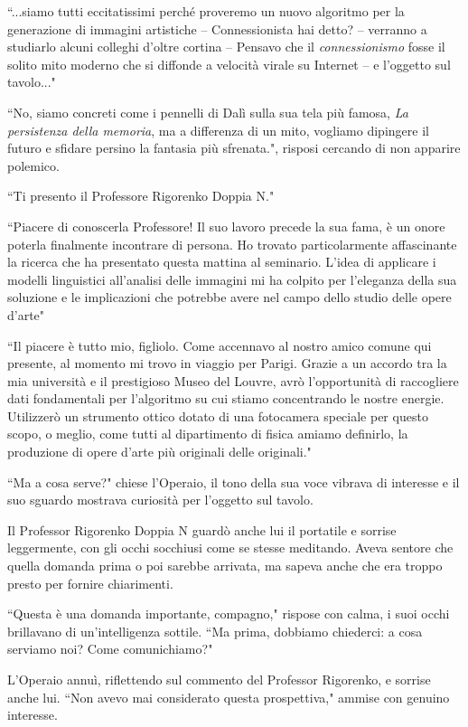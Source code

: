 \documentclass[12pt,b5paper]{article}
\begin{document}
``...siamo tutti eccitatissimi perché proveremo un nuovo algoritmo per la 
generazione di immagini artistiche -- Connessionista hai detto? -- verranno a
studiarlo alcuni colleghi d'oltre cortina -- Pensavo che il \textit{connessionismo}
fosse il solito mito moderno che si diffonde a velocità virale su Internet -- e
l'oggetto sul tavolo..."

``No, siamo concreti come i pennelli di Dalì sulla sua tela più famosa,
\textit{La persistenza della memoria}, ma a differenza di un mito, vogliamo
dipingere il futuro e sfidare persino la fantasia più sfrenata.", risposi 
cercando di non apparire polemico.

``Ti presento il Professore Rigorenko Doppia N."

``Piacere di conoscerla Professore! Il suo lavoro precede la sua fama, è un onore
poterla finalmente incontrare di persona. Ho trovato particolarmente affascinante
la ricerca che ha presentato questa mattina al seminario. L'idea di applicare i
modelli linguistici all'analisi delle immagini mi ha colpito per l'eleganza della
sua soluzione e le implicazioni che potrebbe avere nel campo dello studio delle
opere d'arte"

``Il piacere è tutto mio, figliolo. Come accennavo al nostro amico comune qui 
presente, al momento mi trovo in viaggio per Parigi. Grazie a un accordo tra la
mia università e il prestigioso Museo del Louvre, avrò l'opportunità di
raccogliere dati fondamentali per l'algoritmo su cui stiamo concentrando le
nostre energie. Utilizzerò un strumento ottico dotato di una fotocamera speciale
per questo scopo, o meglio, come tutti al dipartimento di fisica amiamo definirlo,
la produzione di opere d'arte più originali delle originali."

``Ma a cosa serve?" chiese l'Operaio, il tono della sua voce vibrava di
interesse e il suo sguardo mostrava curiosità per l'oggetto sul tavolo.

Il Professor Rigorenko Doppia N guardò anche lui il portatile e sorrise
leggermente, con gli occhi socchiusi come se stesse meditando. Aveva sentore che
quella domanda prima o poi sarebbe arrivata, ma sapeva anche che era troppo
presto per fornire chiarimenti. 

``Questa è una domanda importante, compagno," rispose con calma, i suoi occhi
brillavano di un'intelligenza sottile. ``Ma prima, dobbiamo chiederci: a cosa
serviamo noi? Come comunichiamo?"

L'Operaio annuì, riflettendo sul commento del Professor Rigorenko, e sorrise
anche lui. ``Non avevo mai considerato questa prospettiva," ammise con genuino
interesse.
\end{document}
